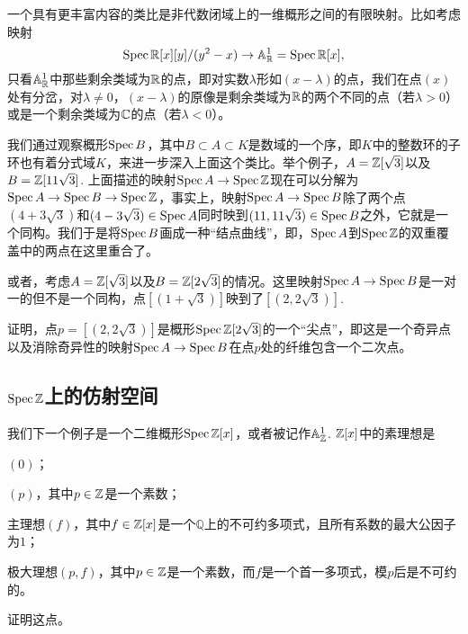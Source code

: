 
一个具有更丰富内容的类比是非代数闭域上的一维概形之间的有限映射。比如考虑映射
\[
	\operatorname{Spec} \mathbb{R}[x][y]/(y^2-x)\to \mathbb{A}_{\mathbb{R}}^1=\operatorname{Spec} \mathbb{R}[x],
\]
只看$\mathbb{A}_{\mathbb{R}}^1$中那些剩余类域为$\mathbb{R}$的点，即对实数$\lambda$形如$(x-\lambda)$的点，我们在点$(x)$处有分岔，对$\lambda\neq 0$，$(x-\lambda)$的原像是剩余类域为$\mathbb{R}$的两个不同的点（若$\lambda>0$）或是一个剩余类域为$\mathbb{C}$的点（若$\lambda<0$）。

我们通过观察概形$\operatorname{Spec} B$，其中$B\subset A\subset K$是数域的一个序，即$K$中的整数环的子环也有着分式域$K$，来进一步深入上面这个类比。举个例子，$A=\mathbb{Z}[\sqrt 3]$以及$B=\mathbb{Z}[11\sqrt 3]$. 上面描述的映射$\operatorname{Spec} A\to \operatorname{Spec} \mathbb{Z}$现在可以分解为$\operatorname{Spec} A\to \operatorname{Spec} B\to \operatorname{Spec} \mathbb{Z}$，事实上，映射$\operatorname{Spec} A\to \operatorname{Spec} B$除了两个点$(4+3\sqrt 3)$和$(4-3\sqrt 3)\in \operatorname{Spec} A$同时映到$(11,11\sqrt 3)\in\operatorname{Spec} B$之外，它就是一个同构。我们于是将$\operatorname{Spec} B$画成一种“结点曲线”，即，$\operatorname{Spec} A$到$\operatorname{Spec} \mathbb{Z}$的双重覆盖中的两点在这里重合了。


或者，考虑$A=\mathbb{Z}[\sqrt 3]$以及$B=\mathbb{Z}[2\sqrt 3]$的情况。这里映射$\operatorname{Spec} A\to\operatorname{Spec} B$是一对一的但不是一个同构，点$[(1+\sqrt 3)]$映到了$[(2,2\sqrt{3})]$.

\begin{exe}
	证明，点$p=[(2,2\sqrt{3})]$是概形$\operatorname{Spec} \mathbb{Z}[2\sqrt 3]$的一个“尖点”，即这是一个奇异点以及消除奇异性的映射$\operatorname{Spec} A\to \operatorname{Spec} B$在点$p$处的纤维包含一个二次点。
\end{exe}

\subsection{\texorpdfstring{$\operatorname{Spec} \mathbb{Z}$}{Spec Z}上的仿射空间} \label{s:2.4.3}

我们下一个例子是一个二维概形$\operatorname{Spec} \mathbb{Z}[x]$，或者被记作$\mathbb{A}_{\mathbb{Z}}^1$. $\mathbb{Z}[x]$中的素理想是
\begin{compactenum}[(i)]
	\item $(0)$；
	\item $(p)$，其中$p\in\mathbb{Z}$是一个素数；
	\item 主理想$(f)$，其中$f\in\mathbb{Z}[x]$是一个$\mathbb{Q}$上的不可约多项式，且所有系数的最大公因子为$1$；
	\item 极大理想$(p,f)$，其中$p\in \mathbb{Z}$是一个素数，而$f$是一个首一多项式，模$p$后是不可约的。
\end{compactenum}

\begin{exe}
	证明这点。
\end{exe}

